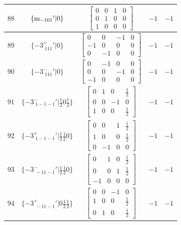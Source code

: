 \documentclass[fleqn,8pt]{jsarticle}
\begin{document}
\begin{longtable}{ccccc}
$ 88 $ & $ \{{\rm m}_{-101}{}'|0\} $ & $ \begin{bmatrix} 0 & 0 & 1 & 0 \\ 0 & 1 & 0 & 0 \\ 1 & 0 & 0 & 0 \end{bmatrix} $ & $ -1 $ & $ -1 $ \\ \hline
$ 89 $ & $ \{-3^{+}_{\,\,111}{}'|0\} $ & $ \begin{bmatrix} 0 & 0 & -1 & 0 \\ -1 & 0 & 0 & 0 \\ 0 & -1 & 0 & 0 \end{bmatrix} $ & $ -1 $ & $ -1 $ \\ \hline
$ 90 $ & $ \{-3^{-}_{\,\,111}{}'|0\} $ & $ \begin{bmatrix} 0 & -1 & 0 & 0 \\ 0 & 0 & -1 & 0 \\ -1 & 0 & 0 & 0 \end{bmatrix} $ & $ -1 $ & $ -1 $ \\ \hline
$ 91 $ & $ \{-3^{-}_{\,\,1-1-1}{}'|\frac{1}{2} 0 \frac{1}{2}\} $ & $ \begin{bmatrix} 0 & 1 & 0 & \frac{1}{2} \\ 0 & 0 & -1 & 0 \\ 1 & 0 & 0 & \frac{1}{2} \end{bmatrix} $ & $ -1 $ & $ -1 $ \\ \hline
$ 92 $ & $ \{-3^{+}_{\,\,1-1-1}{}'|\frac{1}{2} \frac{1}{2} 0\} $ & $ \begin{bmatrix} 0 & 0 & 1 & \frac{1}{2} \\ 1 & 0 & 0 & \frac{1}{2} \\ 0 & -1 & 0 & 0 \end{bmatrix} $ & $ -1 $ & $ -1 $ \\ \hline
$ 93 $ & $ \{-3^{-}_{\,\,-11-1}{}'|\frac{1}{2} \frac{1}{2} 0\} $ & $ \begin{bmatrix} 0 & 1 & 0 & \frac{1}{2} \\ 0 & 0 & 1 & \frac{1}{2} \\ -1 & 0 & 0 & 0 \end{bmatrix} $ & $ -1 $ & $ -1 $ \\ \hline
$ 94 $ & $ \{-3^{+}_{\,\,-11-1}{}'|0 \frac{1}{2} \frac{1}{2}\} $ & $ \begin{bmatrix} 0 & 0 & -1 & 0 \\ 1 & 0 & 0 & \frac{1}{2} \\ 0 & 1 & 0 & \frac{1}{2} \end{bmatrix} $ & $ -1 $ & $ -1 $ \\ \hline

\end{longtable}
\end{document}
